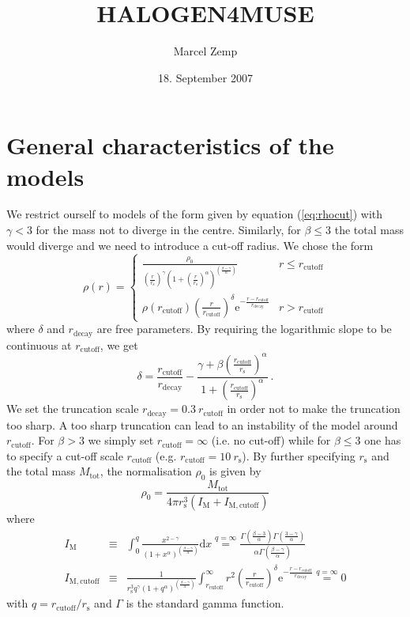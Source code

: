\documentclass[a4paper,10pt]{article}
\author{Marcel Zemp}
\title{HALOGEN4MUSE}
\date{18. September 2007}
\newcommand{\rs}{r_{\mathrm{s}}}
\newcommand{\rcut}{r_{\mathrm{cutoff}}}
\newcommand{\rdec}{r_{\mathrm{decay}}}
\newcommand{\Mtot}{M_{\mathrm{tot}}}
\begin{document}
\maketitle


\section{General characteristics of the models}

We restrict ourself to models of the form given by equation (\ref{eq:rhocut}) with $\gamma < 3$ for the mass not to diverge in the centre. Similarly, for $\beta \leq 3$ the total mass would diverge and we need to introduce a cut-off radius. We chose the form
\begin{equation} \label{eq:rhocut}
\rho(r) = \left\{
\begin{array}{ll}
\frac{\rho_0}{\left(\frac{r}{\rs}\right)^\gamma \left(1+\left(\frac{r}{\rs}\right)^\alpha
\right)^{\left(\frac{\beta-\gamma}{\alpha}\right)}}	&
r \leq \rcut \\
\rho(\rcut) \left(\frac{r}{\rcut}\right)^\delta \mathrm{e}^{-\frac{r-\rcut}{\rdec}} &
r > \rcut
\end{array}
\right.
\end{equation}
where $\delta$ and $\rdec$ are free parameters. By requiring the logarithmic slope to be continuous at $\rcut$, we get
\begin{equation}
\delta = \frac{\rcut}{\rdec} - \frac{\gamma + 
\beta \left(\frac{\rcut}{\rs}\right)^{\alpha}}{1 + \left(\frac{\rcut}{\rs}\right)^{\alpha}}~.
\end{equation}
We set the truncation scale $\rdec = 0.3~\rcut$ in order not to make the truncation too sharp. A too sharp truncation can lead to an instability of the model around $\rcut$. For $\beta > 3$ we simply set $\rcut = \infty$ (i.e. no cut-off) while for $\beta \leq 3$ one has to specify a cut-off scale $\rcut$ (e.g. $\rcut = 10~\rs$). By further specifying $\rs$ and the total mass $\Mtot$, the normalisation $\rho_{0}$ is given by
\begin{equation}
\rho_0 = \frac{\Mtot}{4 \pi \rs^3 (I_{\mathrm{M}} + I_{\mathrm{M,cutoff}})}
\end{equation}
where
\begin{eqnarray}
I_{\mathrm{M}} &\equiv& \int_0^{q} \frac{x^{2-\gamma}}{\left(1+x^\alpha\right)^{\left(\frac{\beta-\gamma}{\alpha}\right)}} \mathrm{d}x
\stackrel{q=\infty}{=} \frac{\Gamma\left(\frac{\beta-3}{\alpha}\right) \Gamma\left(\frac{3-\gamma}{\alpha}\right)}{\alpha \Gamma\left(\frac{\beta-\gamma}{\alpha}\right)} \\
I_{\mathrm{M,cutoff}} &\equiv&
\frac{1}
{\rs^3 q^\gamma \left(1+q^\alpha\right)^{\left(\frac{\beta-\gamma}{\alpha}\right)}}
\int_{\rcut}^{\infty} r^2 \left(\frac{r}{\rcut}\right)^{\delta} \mathrm{e}^{-\frac{r-\rcut}{\rdec}} \stackrel{q=\infty}{=} 0
\end{eqnarray}
with $q = \rcut / \rs$ and $\Gamma$ is the standard gamma function.
\end{document}
